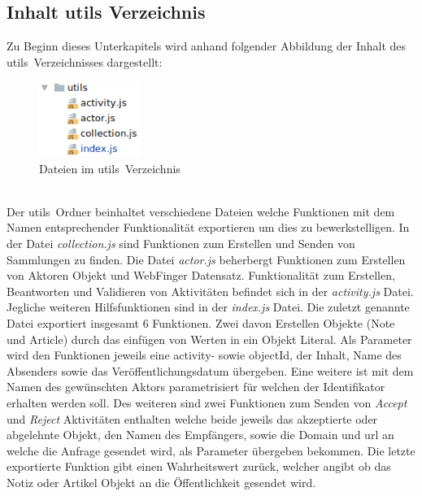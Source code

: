 \subsection{Inhalt utils Verzeichnis}
Zu Beginn dieses Unterkapitels wird anhand folgender Abbildung der Inhalt des \glqq utils\grqq~Verzeichnisses dargestellt:
\begin{figure}[h]
	\centering
	\includegraphics[width=3.3cm]{figures/utils.png}
	\caption{Dateien im \glqq utils\grqq~Verzeichnis}
	\label{fig:utils}
\end{figure}\\
Der \glqq utils\grqq~Ordner beinhaltet verschiedene Dateien welche Funktionen mit dem Namen entsprechender Funktionalität exportieren um dies zu bewerkstelligen. In der Datei \textit{collection.js} sind Funktionen zum Erstellen und Senden von Sammlungen zu finden. Die Datei \textit{actor.js} beherbergt Funktionen zum Erstellen von Aktoren Objekt und WebFinger Datensatz. Funktionalität zum Erstellen, Beantworten und Validieren von Aktivitäten befindet sich in der \textit{activity.js} Datei. Jegliche weiteren Hilfsfunktionen sind in der \textit{index.js} Datei. Die zuletzt genannte Datei exportiert insgesamt 6 Funktionen. Zwei davon Erstellen Objekte (Note und Article) durch das einfügen von Werten in ein Objekt Literal. Als Parameter wird den Funktionen jeweils eine activity- sowie objectId, der Inhalt, Name des Absenders sowie das Veröffentlichungsdatum übergeben. Eine weitere ist mit dem Namen des gewünschten Aktors parametrisiert für welchen der Identifikator erhalten werden soll. Des weiteren sind zwei Funktionen zum Senden von \textit{Accept} und \textit{Reject} Aktivitäten enthalten welche beide jeweils das akzeptierte oder abgelehnte Objekt, den Namen des Empfängers, sowie die Domain und \gls{url} an welche die Anfrage gesendet wird, als Parameter übergeben bekommen. Die letzte exportierte Funktion gibt einen Wahrheitswert zurück, welcher angibt ob das Notiz oder Artikel Objekt an die Öffentlichkeit gesendet wird.

